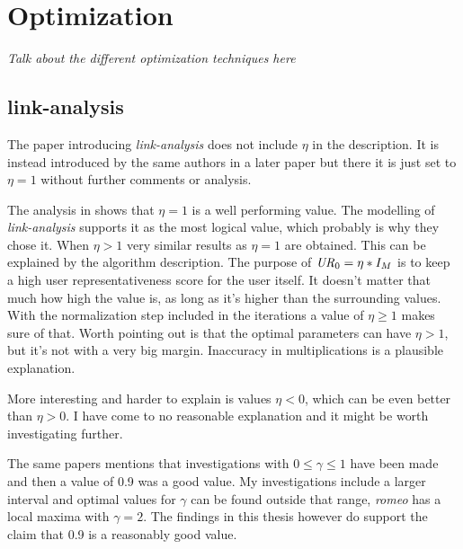 



\section{Optimization}

\textit{Talk about the different optimization techniques here}

\subsection{link-analysis}

The paper introducing \textit{link-analysis} \cite{huang2004link} does not include $\eta$ in the description. It is instead introduced by the same authors in a later paper \cite{huang2007comparison} but there it is just set to $\eta = 1$ without further comments or analysis.

The analysis in  shows that $\eta = 1$ is a well performing value. The modelling of \textit{link-analysis} supports it as the most logical value, which probably is why they chose it. When $\eta > 1$ very similar results as $\eta = 1$ are obtained. This can be explained by the algorithm description. The purpose of $\mathit{UR}_0 = \eta * I_M$ is to keep a high user representativeness score for the user itself. It doesn't matter that much how high the value is, as long as it's higher than the surrounding values. With the normalization step included in the iterations a value of $\eta \geq 1$ makes sure of that. Worth pointing out is that the optimal parameters can have $\eta > 1$, but it's not with a very big margin. Inaccuracy in multiplications is a plausible explanation.

More interesting and harder to explain is values $\eta < 0$, which can be even better than $\eta > 0$. I have come to no reasonable explanation and it might be worth investigating further.

The same papers \cite{huang2004link, huang2007comparison} mentions that investigations with $0 \leq \gamma \leq 1$ have been made and then a value of 0.9 was a good value. My investigations include a larger interval and optimal values for $\gamma$ can be found outside that range, \textit{romeo} has a local maxima with $\gamma = 2$. The findings in this thesis however do support the claim that 0.9 is a reasonably good value.


